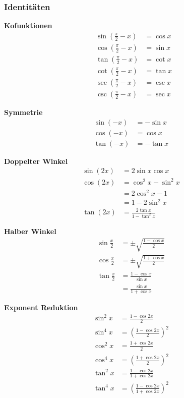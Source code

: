 \subsubsection{Identitäten}
\begin{multicols}{2}

    \textbf{Kofunktionen}
    \begin{align*}
         & \sin(\frac{\pi}{2} - x) & = \cos x \\
         & \cos(\frac{\pi}{2} - x) & = \sin x \\
         & \tan(\frac{\pi}{2} - x) & = \cot x \\
         & \cot(\frac{\pi}{2} - x) & = \tan x \\
         & \sec(\frac{\pi}{2} - x) & = \csc x \\
         & \csc(\frac{\pi}{2} - x) & = \sec x
    \end{align*}

    \textbf{Symmetrie}
    \begin{align*}
        \sin(-x) & = - \sin x \\
        \cos(-x) & = \cos x   \\
        \tan(-x) & = -\tan x
    \end{align*}

    \textbf{Doppelter Winkel}
    \begin{align*}
        \sin(2x) & = 2 \sin x \cos x               \\
        \cos(2x) & = \cos^2 x - \sin^2 x           \\
                 & = 2 \cos^2 x - 1                \\
                 & = 1 - 2 \sin^2 x                \\
        \tan(2x) & = \frac{2 \tan x}{1 - \tan^2 x}
    \end{align*}

    \textbf{Halber Winkel}
    \begin{align*}
        \sin \frac{x}{2} & = \pm \sqrt{ \frac{1 - \cos x }{2} } \\
        \cos \frac{x}{2} & = \pm \sqrt{ \frac{1 + \cos x }{2} } \\
        \tan \frac{x}{2} & = \frac{1 - \cos x }{\sin x}         \\
                         & = \frac{ \sin x }{ 1 + \cos x }
    \end{align*}

    \textbf{Exponent Reduktion}
    \begin{align*}
        \sin^2 x & = \frac{1 - \cos 2x}{2}               \\
        \sin^4x  & = (\frac{1 - \cos 2x}{2})^2           \\
        \cos^2 x & = \frac{1 + \cos 2x}{2}               \\
        \cos^4x  & = (\frac{1 + \cos 2x}{2})^2           \\
        \tan^2 x & = \frac{1 - \cos 2x}{1 + \cos 2x}     \\
        \tan^4 x & =( \frac{1 - \cos 2x}{1 + \cos 2x})^2
    \end{align*}


\end{multicols}
